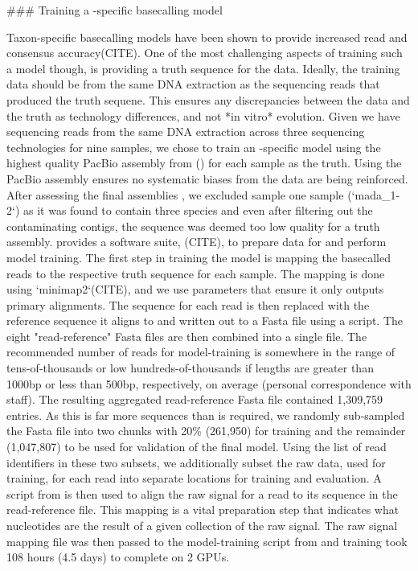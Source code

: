 \begin{markdown}
### Training a \mtb{}-specific \ont{} basecalling model

Taxon-specific \ont{} basecalling models have been shown to provide increased read and consensus accuracy(CITE). One of the most challenging aspects of training such a model though, is providing a truth sequence for the \ont{} data. Ideally, the training data should be from the same DNA extraction as the sequencing reads that produced the truth sequene. This ensures any discrepancies between the \ont{} data and the truth as technology differences, and not *in vitro* evolution. Given we have sequencing reads from the same DNA extraction across three sequencing technologies for nine samples, we chose to train an \mtb{}-specific model using the highest quality PacBio assembly from () for each sample as the truth. Using the PacBio assembly ensures no systematic biases from the \ont{} data are being reinforced.   
After assessing the final assemblies , we excluded sample one sample (`mada_1-2`) as it was found to contain three species and even after filtering out the contaminating contigs, the \mtb{} sequence was deemed too low quality for a truth assembly.  
\ont{} provides a software suite, \taiyaki{}(CITE), to prepare data for and perform model training. The first step in training the model is mapping the \ont{} basecalled reads to the respective truth sequence for each sample. The mapping is done using `minimap2`(CITE), and we use parameters that ensure it only outputs primary alignments. The sequence for each read is then replaced with the reference sequence it aligns to and written out to a Fasta file using a \taiyaki{} script. The eight "read-reference" Fasta files are then combined into a single file. The recommended number of reads for model-training is somewhere in the range of tens-of-thousands or low hundreds-of-thousands if lengths are greater than 1000bp or less than 500bp, respectively, on average (personal correspondence with \ont{} staff). The resulting aggregated read-reference Fasta file contained 1,309,759 entries. As this is far more sequences than is required, we randomly sub-sampled the Fasta file into two chunks with 20\% (261,950) for training and the remainder (1,047,807) to be used for validation of the final model. Using the list of read identifiers in these two subsets, we additionally subset the raw data, used for training, for each read into separate locations for training and evaluation. A script from \taiyaki{} is then used to align the raw signal for a read to its sequence in the read-reference file. This mapping is a vital preparation step that indicates what nucleotides are the result of a given collection of the raw signal. The raw signal mapping file was then passed to the model-training script from \taiyaki{} and training took 108 hours (4.5 days) to complete on 2 GPUs.


\end{markdown}

